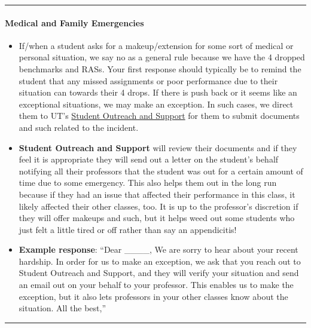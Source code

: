 \documentclass[
]{article}
\providecommand{\tightlist}{%
  \setlength{\itemsep}{0pt}\setlength{\parskip}{0pt}}
\begin{document}
\begin{center}\rule{0.5\linewidth}{0.5pt}\end{center}

\hypertarget{medical-and-family-emergencies}{%
\paragraph{Medical and Family Emergencies}\label{medical-and-family-emergencies}}

\begin{itemize}
\tightlist
\item
  If/when a student asks for a makeup/extension for some sort of medical or personal situation, we say no as a general rule because we have the 4 dropped benchmarks and RASs. Your first response should typically be to remind the student that any missed assignments or poor performance due to their situation can towards their 4 drops. If there is push back or it seems like an exceptional situations, we may make an exception. In such cases, we direct them to UT's \href{https://deanofstudents.utexas.edu/sos/index.php}{Student Outreach and Support} for them to submit documents and such related to the incident.\\
\item
  \textbf{Student Outreach and Support} will review their documents and if they feel it is appropriate they will send out a letter on the student's behalf notifying all their professors that the student was out for a certain amount of time due to some emergency. This also helps them out in the long run because if they had an issue that affected their performance in this class, it likely affected their other classes, too. It is up to the professor's discretion if they will offer makeups and such, but it helps weed out some students who just felt a little tired or off rather than say an appendicitis!\\
\item
  \textbf{Example response}: ``Dear \_\_\_\_, We are sorry to hear about your recent hardship. In order for us to make an exception, we ask that you reach out to Student Outreach and Support, and they will verify your situation and send an email out on your behalf to your professor. This enables us to make the exception, but it also lets professors in your other classes know about the situation. All the best,''
\end{itemize}

\begin{center}\rule{0.5\linewidth}{0.5pt}\end{center}
\end{document}
